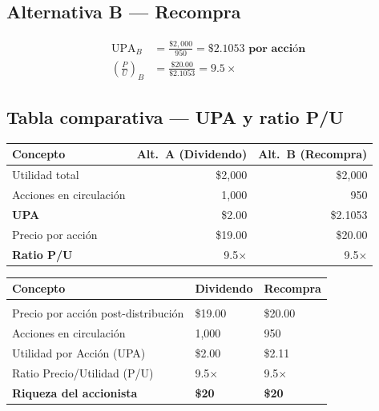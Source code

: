 \documentclass[12pt,a4paper]{article}
\begin{document}
\subsection*{Alternativa B --- Recompra}

\begin{align}
\text{UPA}_B &= \frac{\$2{,}000}{950} = \mathbf{\$2.1053 \text{ por acci\'on}} \\[8pt]
\left(\frac{P}{U}\right)_B &= \frac{\$20.00}{\$2.1053} = \mathbf{9.5\times}
\end{align}

\subsection*{Tabla comparativa --- UPA y ratio P/U}

\begin{center}
\begin{tabular}{lrr}
\toprule
\textbf{Concepto} & \textbf{Alt.\ A (Dividendo)} & \textbf{Alt.\ B (Recompra)} \\
\midrule
Utilidad total                    & \$2{,}000  & \$2{,}000  \\
Acciones en circulaci\'on         & 1{,}000    & 950        \\
\textbf{UPA}                      & \$2.00     & \$2.1053   \\
Precio por acci\'on               & \$19.00    & \$20.00    \\
\textbf{Ratio P/U}                & 9.5$\times$ & 9.5$\times$ \\
\bottomrule
\end{tabular}
\end{center}

\vspace{1cm}

\begin{cajaresultado}
\begin{center}
\large
\begin{tabular}{p{6.5cm}p{4cm}p{4cm}}
\textbf{Concepto}                    & \textbf{Dividendo} & \textbf{Recompra} \\[4pt]
\hline\\[-6pt]
Precio por acci\'on post-distribuci\'on & \$19.00        & \$20.00 \\[4pt]
Acciones en circulaci\'on               & 1{,}000        & 950     \\[4pt]
Utilidad por Acci\'on (UPA)             & \$2.00         & \$2.11  \\[4pt]
Ratio Precio/Utilidad (P/U)             & 9.5$\times$    & 9.5$\times$ \\[4pt]
\textbf{Riqueza del accionista}         & \textbf{\$20}  & \textbf{\$20} \\
\end{tabular}
\end{center}
\end{cajaresultado}
\end{document}

